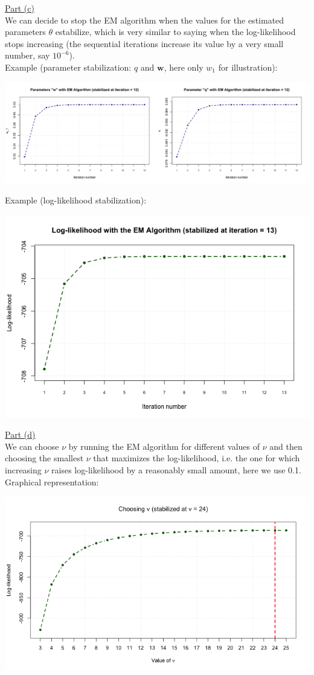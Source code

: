 \documentclass[a4paper, 11pt]{article}
\begin{document}
\underline{Part (c)}\\
\newline We can decide to stop the EM algorithm when the values for the estimated parameters $\theta$ estabilize, which is very similar to saying when the log-likelihood stops increasing (the sequential iterations increase its value by a very small number, say $10^{-6}$).\\
\newline Example (parameter stabilization: $q$ and $\mathbf{w}$, here only $w_1$ for illustration):
\begin{center}
\includegraphics[scale=0.4]{ps6_plot3.png}
\end{center}
Example (log-likelihood stabilization):
\begin{center}
\includegraphics[scale=0.65]{ps6_plot4.png}
\end{center}
\underline{Part (d)}\\
\newline We can choose $\nu$ by running the EM algorithm for different values of $\nu$ and then choosing the smallest $\nu$ that maximizes the log-likelihood, i.e. the one for which increasing $\nu$ raises log-likelihood by a reasonably small amount, here we use 0.1.\\
\newline Graphical representation:
\begin{center}
\includegraphics[scale=0.65]{ps6_plot5.png}
\end{center}
\end{document}
